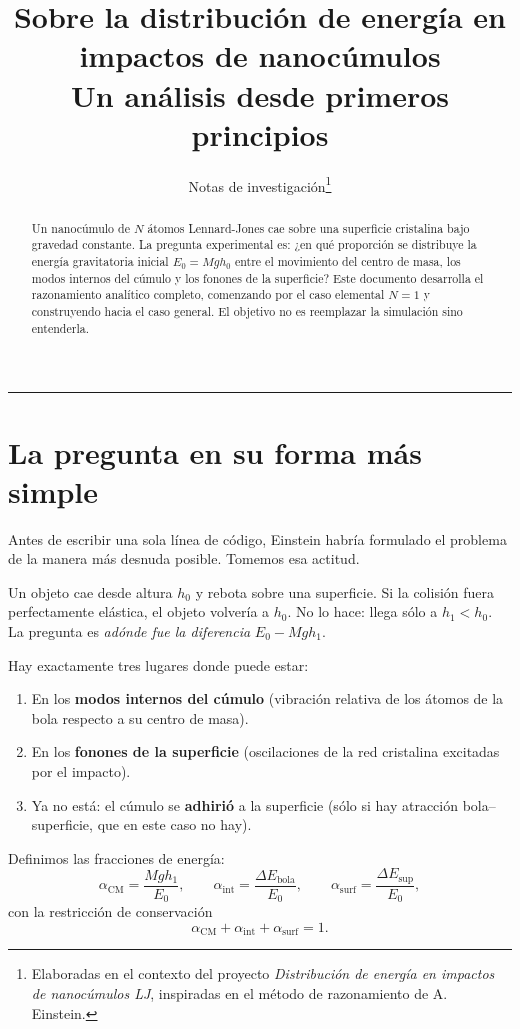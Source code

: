 \documentclass[11pt, a4paper]{article}
\title{\large\bfseries Sobre la distribución de energía en impactos de nanocúmulos\\[4pt]
       \normalsize\mdseries Un análisis desde primeros principios}
\author{Notas de investigación\thanks{Elaboradas en el contexto del proyecto
        \emph{Distribución de energía en impactos de nanocúmulos LJ},
        inspiradas en el método de razonamiento de A. Einstein.}}
\date{}
\begin{document}
\maketitle
\thispagestyle{empty}

\begin{abstract}
\noindent
Un nanocúmulo de $N$ átomos Lennard-Jones cae sobre una superficie cristalina
bajo gravedad constante. La pregunta experimental es: ¿en qué proporción se
distribuye la energía gravitatoria inicial $E_0 = Mgh_0$ entre el movimiento
del centro de masa, los modos internos del cúmulo y los fonones de la
superficie? Este documento desarrolla el razonamiento analítico completo,
comenzando por el caso elemental $N=1$ y construyendo hacia el caso general.
El objetivo no es reemplazar la simulación sino entenderla.
\end{abstract}

\tableofcontents
\vspace{1em}
\hrule
\vspace{1.5em}

\section{La pregunta en su forma más simple}

Antes de escribir una sola línea de código, Einstein habría formulado el
problema de la manera más desnuda posible. Tomemos esa actitud.

Un objeto cae desde altura $h_0$ y rebota sobre una superficie. Si la
colisión fuera perfectamente elástica, el objeto volvería a $h_0$. No lo hace:
llega sólo a $h_1 < h_0$. La pregunta es \emph{adónde fue la diferencia}
$E_0 - Mgh_1$.

Hay exactamente tres lugares donde puede estar:
\begin{enumerate}
  \item En los \textbf{modos internos del cúmulo} (vibración relativa de los
        átomos de la bola respecto a su centro de masa).
  \item En los \textbf{fonones de la superficie} (oscilaciones de la red
        cristalina excitadas por el impacto).
  \item Ya no está: el cúmulo se \textbf{adhirió} a la superficie
        (sólo si hay atracción bola--superficie, que en este caso no hay).
\end{enumerate}

Definimos las fracciones de energía:
\begin{equation}
  \alpha_\text{CM} = \frac{Mgh_1}{E_0}, \qquad
  \alpha_\text{int} = \frac{\Delta E_\text{bola}}{E_0}, \qquad
  \alpha_\text{surf} = \frac{\Delta E_\text{sup}}{E_0},
\end{equation}
con la restricción de conservación
\begin{equation}
  \alpha_\text{CM} + \alpha_\text{int} + \alpha_\text{surf} = 1.
  \label{eq:conservacion}
\end{equation}
\end{document}
